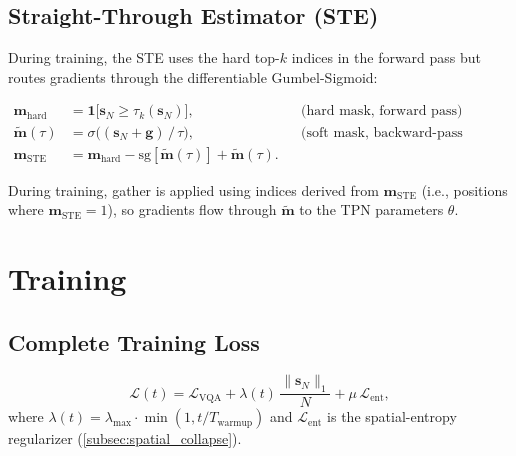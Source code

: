 \documentclass[11pt,a4paper]{article}
\newcommand{\sg}[1]{\mathrm{sg}\!\left[#1\right]}
\newcommand{\vm}{\mathbf{m}}
\newcommand{\vs}{\mathbf{s}}
\begin{document}
\subsection{Straight-Through Estimator (STE)}

During training, the STE uses the hard top-$k$ indices in the forward pass
but routes gradients through the differentiable Gumbel-Sigmoid:

\begin{definitionbox}[title={Straight-Through Estimator for Top-$k$ Selection}]
\begin{align}
  \vm_{\mathrm{hard}}
    &= \mathbf{1}\bigl[\vs_N \geq \tau_k(\vs_N)\bigr],
    && \text{(hard mask, forward pass)}
    \label{eq:hard_mask} \\[3pt]
  \tilde{\vm}(\tau)
    &= \sigma\!\bigl((\vs_N + \mathbf{g})\,/\,\tau\bigr),
    && \text{(soft mask, backward-pass gradients)}
    \label{eq:soft_mask} \\[3pt]
  \vm_{\mathrm{STE}}
    &= \vm_{\mathrm{hard}} - \sg{\tilde{\vm}(\tau)} + \tilde{\vm}(\tau).
    \label{eq:ste}
\end{align}
\end{definitionbox}

During training, gather is applied using indices derived from
$\vm_{\mathrm{STE}}$ (i.e., positions where $\vm_{\mathrm{STE}} = 1$),
so gradients flow through $\tilde{\vm}$ to the TPN parameters $\theta$.

\section{Training}
\label{sec:training}

\subsection{Complete Training Loss}

\begin{equation}
  \mathcal{L}(t) = \mathcal{L}_{\mathrm{VQA}}
    + \lambda(t)\, \frac{\lVert \vs_N \rVert_1}{N}
    + \mu\, \mathcal{L}_{\mathrm{ent}},
  \label{eq:total_loss}
\end{equation}
where $\lambda(t) = \lambda_{\max} \cdot \min(1, t/T_{\mathrm{warmup}})$
and $\mathcal{L}_{\mathrm{ent}}$ is the spatial-entropy regularizer
(\cref{subsec:spatial_collapse}).
\end{document}
